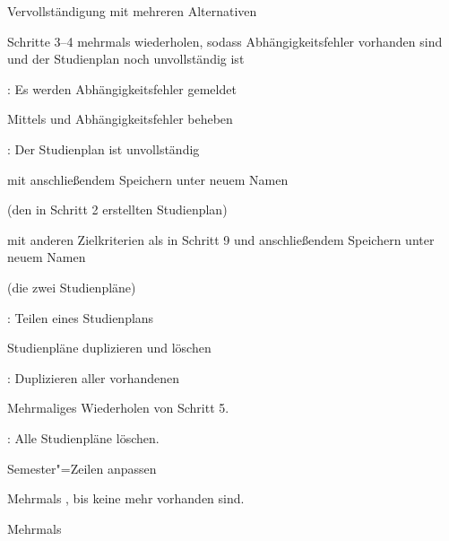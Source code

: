 \begin{scenario}{Vervollständigung mit mehreren Alternativen}
	\item {}
	\item {}
	\item {}
	\item {}
	\item Schritte 3–4 mehrmals wiederholen, sodass Abhängigkeitsfehler vorhanden sind und der \gls{Studienplan} noch unvollständig ist
	\item {}: Es werden Abhängigkeitsfehler gemeldet
	\item Mittels  und  Abhängigkeitsfehler beheben
	\item {}: Der Studienplan ist unvollständig
	\item {} mit anschließendem Speichern unter neuem Namen
	\item {}
	\item {} (den in Schritt 2 erstellten Studienplan)
	\item {} mit anderen Zielkriterien als in Schritt 9 und anschließendem Speichern unter neuem Namen
	\item {}
	\item {} (die zwei  Studienpläne)
	\item {}
	\item {}: Teilen eines Studienplans
\end{scenario}

\begin{scenario}{Studienpläne duplizieren und löschen}
	\item {}
	\item {}
	\item {}
	\item {}
	\item {}: Duplizieren aller vorhandenen 
	\item Mehrmaliges Wiederholen von Schritt 5.
	\item {}: Alle Studienpläne löschen.
\end{scenario}

\begin{scenario}{Semester"=Zeilen anpassen}
	\item {}
	\item {}
	\item Mehrmals , bis keine mehr vorhanden sind.
	\item Mehrmals 
	\item {}
\end{scenario}



